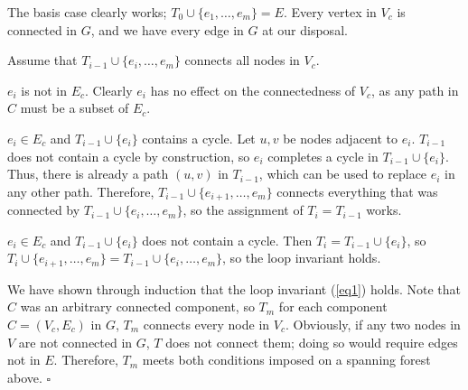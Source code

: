 \documentclass{article}
\newenvironment{solution}
	{\noindent{\bf Solution:}}{\hfill$\square$}
\begin{document}
\begin{solution}
The basis case clearly works; $T_0\cup\{e_1,\ldots,e_m\}=E$. Every
vertex in $V_c$ is connected in $G$, and we have every edge in $G$ at our
disposal.

Assume that $T_{i-1}\cup\{e_i,\ldots,e_m\}$ connects all nodes in $V_c$.

 $e_i$ is not in $E_c$. Clearly $e_i$ has no
effect on the connectedness of $V_c$, as any path in $C$ must be
a subset of $E_c$.

 $e_i\in E_c$ and $T_{i-1}\cup\{e_i\}$ contains
a cycle. Let $u,v$ be nodes adjacent to $e_i$. $T_{i-1}$ does not 
contain a cycle by construction, so $e_i$ completes a cycle in 
$T_{i-1}\cup\{e_i\}$. Thus, there is already a path $(u,v)$ in $T_{i-1}$,
which can be used to replace $e_i$ in any other path. Therefore,
$T_{i-1}\cup\{e_{i+1},\ldots,e_m\}$ connects everything that was connected
by $T_{i-1}\cup\{e_i,\ldots,e_m\}$, so the assignment of $T_i=T_{i-1}$ works.

 $e_i\in E_c$ and $T_{i-1}\cup\{e_i\}$ does not
contain a cycle. Then $T_i=T_{i-1}\cup\{e_i\}$, so
$T_i\cup\{e_{i+1},\ldots,e_m\}=T_{i-1}\cup\{e_i,\ldots,e_m\}$, so the loop
invariant holds.

We have shown through induction that the loop invariant (\ref{eq1}) holds.
Note that $C$ was an arbitrary connected component, so $T_m$ for each 
component $C=(V_c,E_c)$ in $G$, $T_m$ connects every node in $V_c$. 
Obviously, if any two nodes in $V$ are not connected in $G$, $T$ does
not connect them; doing so would require edges not in $E$. Therefore,
$T_m$ meets both conditions imposed on a spanning forest above.
\end{solution}
\end{document}
